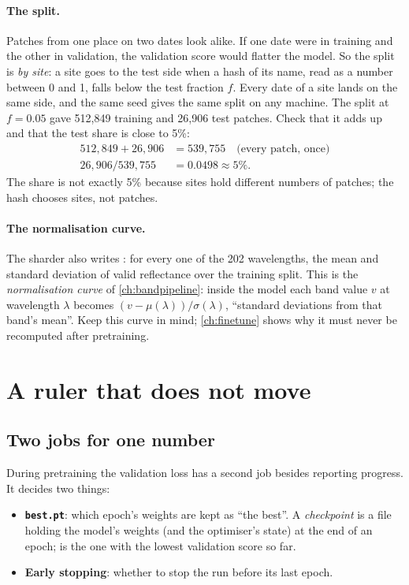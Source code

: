 \paragraph{The split.} Patches from one place on two dates look alike. If one date were in training and the other in
validation, the validation score would flatter the model. So the split is \emph{by site}: a site goes to the test
side when a hash of its name, read as a number between 0 and 1, falls below the test fraction $f$. Every date of a
site lands on the same side, and the same seed gives the same split on any machine. The  split at
$f = 0.05$ gave 512,849 training and 26,906 test patches.\tbrk{} Check that it adds up
and that the test share is close to 5\%:
\begin{align*}
  512{,}849 + 26{,}906 &= 539{,}755 \quad\text{(every patch, once)}\\
  26{,}906 / 539{,}755 &= 0.0498 \approx 5\%.
\end{align*}
The share is not exactly 5\% because sites hold different numbers of patches; the hash chooses sites, not patches.

\paragraph{The normalisation curve.} The sharder also writes : for every one of the 202
wavelengths, the mean and standard deviation of valid reflectance over the training split. This is the
\emph{normalisation curve} of \cref{ch:bandpipeline}: inside the model each band value $v$ at wavelength $\lambda$
becomes $(v - \mu(\lambda)) / \sigma(\lambda)$, ``standard deviations from that band's mean''. Keep this curve in
mind; \cref{ch:finetune} shows why it must never be recomputed after pretraining.

\section{A ruler that does not move}\label{sec:pretrain:ruler}

\subsection{Two jobs for one number}

During pretraining the validation loss has a second job besides reporting progress. It decides two things:
\begin{itemize}
  \item \textbf{\texttt{best.pt}}: which epoch's weights are kept as ``the best''. A
    \emph{checkpoint} is a file holding the model's weights (and the optimiser's state) at the end of an epoch;
     is the one with the lowest validation score so far.
  \item \textbf{Early stopping}: whether to stop the run before its last epoch.
\end{itemize}

